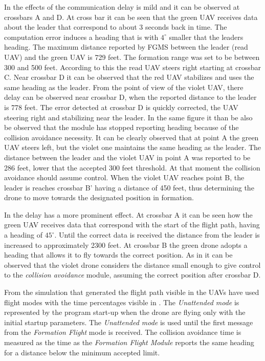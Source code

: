 
\newpage
In  the effects of the communication delay
is mild and it can be observed at crossbars A and D. At cross bar it can
be seen that the green UAV receives data about the leader that correspond to 
about 3 seconds back in time. The computation error induces a heading that is 
with $4^{\circ}$ smaller that the leaders heading. The maximum distance reported
by FGMS between the leader (read UAV) and the green UAV is 729 feet. The formation
range was set to be between 300 and 500 feet. According to this the read UAV
steers right starting at crossbar C. Near crossbar D it can be observed that 
the red UAV stabilizes and uses the same heading as the leader. From the point
of view of the violet UAV, there delay can be observed near crossbar D, when
the reported distance to the leader is 778 feet. The error detected at crossbar 
D is quickly corrected, the UAV steering right and stabilizing near the leader.
In the same figure it than be also be observed that the module has stopped reporting
heading because of the collision avoidance necessity. It can be clearly observed
that at point A the green UAV steers left, but the violet one maintains the
same heading as the leader. The distance between the leader and the violet UAV
in point A was reported to be 286 feet, lower that the accepted 300 feet threshold.
At that moment the collision avoidance should assume control. When the violet UAV
reaches point B,  the leader is reaches crossbar B' having a distance of 450 feet, 
thus determining the drone to move towards the designated position in formation.

In  the delay has a more prominent effect.
At crossbar A it can be seen how the green UAV receives data that correspond
with the start of the flight path, having a heading of $45^{\circ}$. Until the
correct data is received the distance from the leader is increased to approximately
2300 feet. At crossbar B the green drone adopts a heading that allows it to fly
towards the correct position. As in  
it can be observed that the violet drone considers the distance small enough
to give control to the \textit{collision avoidance} module,  assuming
the correct position after crossbar D.

From the simulation that generated the flight path visible in 
 the UAVs have used flight modes with the 
time percentages visible in . The
\textit{Unattended mode} is represented by the program start-up when the 
drone are flying only with the initial startup parameters. The \textit{Unattended mode}
is used until the first message from the \textit{Formation Flight} mode is received.
The collision avoidance time is measured as the time as the \textit{Formation
Flight Module} reports the same heading for a distance below the minimum accepted
limit.

